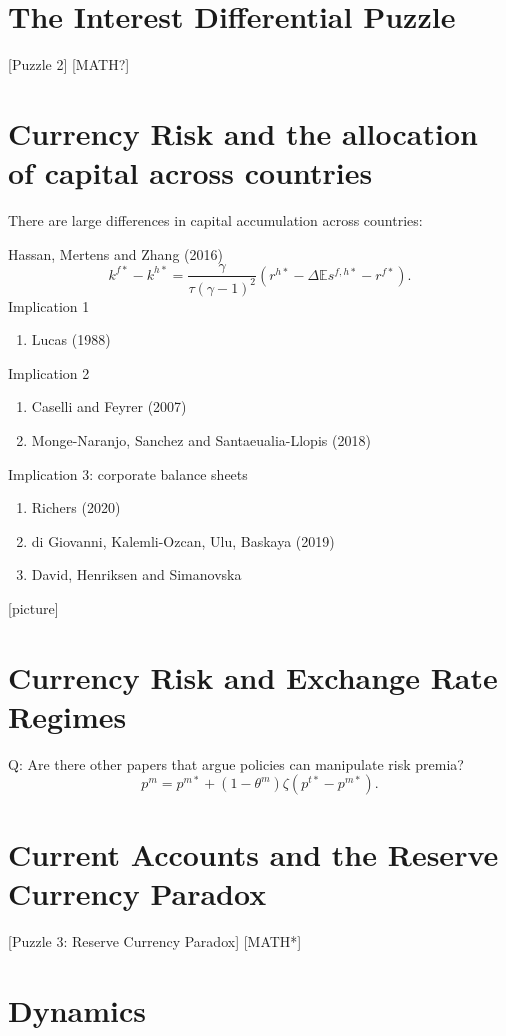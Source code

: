 \documentclass{ar-1col}
\begin{document}
\section{The Interest Differential Puzzle}

[Puzzle 2]
[MATH?]

\section{Currency Risk and the allocation of capital across countries}
There are large differences in capital accumulation across countries:

Hassan, Mertens and Zhang (2016)
\begin{equation}\label{eq_link_k_r}
  k^{f\ast}-k^{h\ast} = \frac{\gamma}{\tau(\gamma-1)^2}\left(r^{h \ast} - \Delta \mathbb{E} s^{f, h \ast} - r^{f \ast}\right).
\end{equation}
Implication 1
\begin{enumerate}
\item Lucas (1988)
\end{enumerate}
Implication 2
\begin{enumerate}
\item Caselli and Feyrer (2007)
\item Monge-Naranjo, Sanchez and Santaeualia-Llopis (2018)
\end{enumerate}
Implication 3: corporate balance sheets
\begin{enumerate}
\item Richers (2020)
\item di Giovanni, Kalemli-Ozcan, Ulu, Baskaya (2019)
\item David, Henriksen and Simanovska
\end{enumerate} [picture]
\section{Currency Risk and Exchange Rate Regimes}
Q: Are there other papers that argue policies can manipulate risk
premia?
\begin{equation*}
  p^m = p^{m \ast} + (1 - \theta^m) \zeta (p^{t \ast} - p^{m \ast}).
\end{equation*}
\section{Current Accounts and the Reserve Currency Paradox}
 [Puzzle 3: Reserve Currency Paradox]
 [MATH*]

\section{Dynamics}
\end{document}
